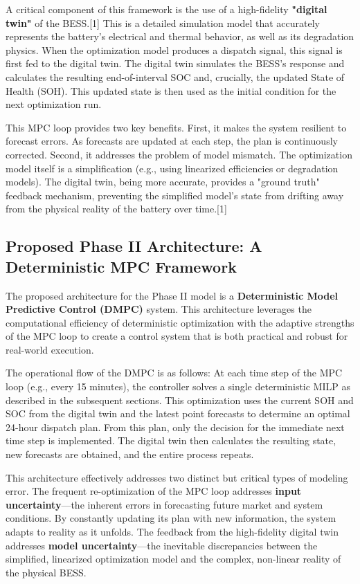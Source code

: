 A critical component of this framework is the use of a high-fidelity \textbf{"digital twin"} of the BESS.[1] This is a detailed simulation model that accurately represents the battery's electrical and thermal behavior, as well as its degradation physics. When the optimization model produces a dispatch signal, this signal is first fed to the digital twin. The digital twin simulates the BESS's response and calculates the resulting end-of-interval SOC and, crucially, the updated State of Health (SOH). This updated state is then used as the initial condition for the next optimization run.

This MPC loop provides two key benefits. First, it makes the system resilient to forecast errors. As forecasts are updated at each step, the plan is continuously corrected. Second, it addresses the problem of model mismatch. The optimization model itself is a simplification (e.g., using linearized efficiencies or degradation models). The digital twin, being more accurate, provides a "ground truth" feedback mechanism, preventing the simplified model's state from drifting away from the physical reality of the battery over time.[1]

\subsection{Proposed Phase II Architecture: A Deterministic MPC Framework}

The proposed architecture for the Phase II model is a \textbf{Deterministic Model Predictive Control (DMPC)} system. This architecture leverages the computational efficiency of deterministic optimization with the adaptive strengths of the MPC loop to create a control system that is both practical and robust for real-world execution.

The operational flow of the DMPC is as follows: At each time step of the MPC loop (e.g., every 15 minutes), the controller solves a single deterministic MILP as described in the subsequent sections. This optimization uses the current SOH and SOC from the digital twin and the latest point forecasts to determine an optimal 24-hour dispatch plan. From this plan, only the decision for the immediate next time step is implemented. The digital twin then calculates the resulting state, new forecasts are obtained, and the entire process repeats.

This architecture effectively addresses two distinct but critical types of modeling error. The frequent re-optimization of the MPC loop addresses \textbf{input uncertainty}—the inherent errors in forecasting future market and system conditions. By constantly updating its plan with new information, the system adapts to reality as it unfolds. The feedback from the high-fidelity digital twin addresses \textbf{model uncertainty}—the inevitable discrepancies between the simplified, linearized optimization model and the complex, non-linear reality of the physical BESS.


